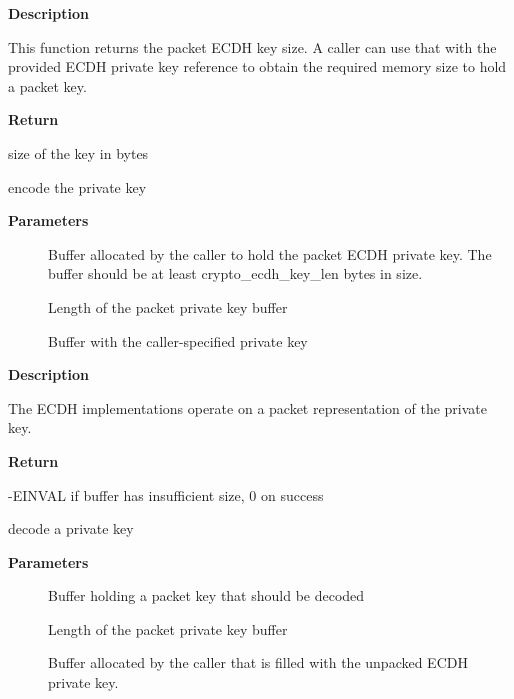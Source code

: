 \documentclass[a4paper,8pt,english]{sphinxmanual}
\begin{document}
\textbf{Description}

This function returns the packet ECDH key size. A caller can use that
with the provided ECDH private key reference to obtain the required
memory size to hold a packet key.

\textbf{Return}

size of the key in bytes

\begin{fulllineitems}
\label{crypto/api-kpp:c.crypto_ecdh_encode_key}
encode the private key

\end{fulllineitems}


\textbf{Parameters}
\begin{description}
\item[{}] \leavevmode
Buffer allocated by the caller to hold the packet ECDH
private key. The buffer should be at least crypto\_ecdh\_key\_len
bytes in size.

\item[{}] \leavevmode
Length of the packet private key buffer

\item[{}] \leavevmode
Buffer with the caller-specified private key

\end{description}

\textbf{Description}

The ECDH implementations operate on a packet representation of the private
key.

\textbf{Return}

-EINVAL if buffer has insufficient size, 0 on success

\begin{fulllineitems}
\label{crypto/api-kpp:c.crypto_ecdh_decode_key}
decode a private key

\end{fulllineitems}


\textbf{Parameters}
\begin{description}
\item[{}] \leavevmode
Buffer holding a packet key that should be decoded

\item[{}] \leavevmode
Length of the packet private key buffer

\item[{}] \leavevmode
Buffer allocated by the caller that is filled with the
unpacked ECDH private key.

\end{description}
\end{document}
